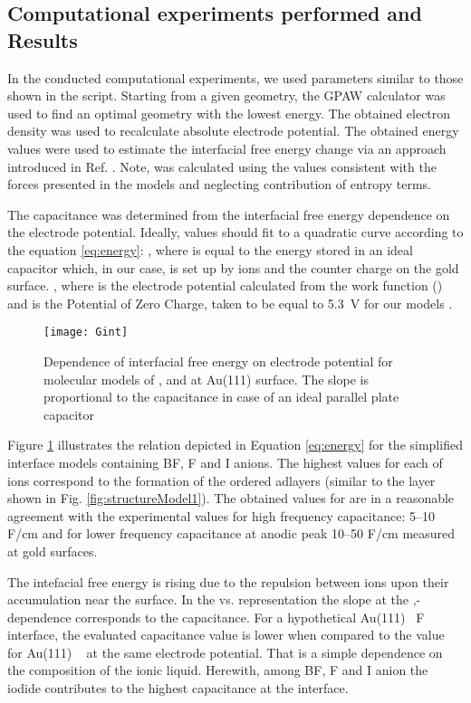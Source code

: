 \documentclass[a4paper,10pt]{article}
\begin{document}
\subsection{Computational experiments performed and Results\label{results}}

In the conducted computational experiments, we used parameters similar to those shown in the script. Starting from a given geometry, the GPAW calculator was used to find an optimal geometry with the lowest energy. The obtained electron density was used to recalculate absolute electrode potential. The obtained energy values were used to estimate the interfacial free energy change via an approach introduced in Ref. \cite{rossmeisl}. Note,  was calculated using the values consistent with the forces presented in the models and neglecting contribution of entropy terms.

The capacitance was determined from the interfacial free energy dependence on the electrode potential. Ideally,  values should fit to a quadratic curve according to the equation \ref{eq:energy}: , where  is equal to the energy stored in an ideal capacitor which, in our case, is set up by ions and the counter charge on the gold surface. , where  is the electrode potential calculated from the work function () and  is the Potential of Zero Charge, taken to be equal to 5.3~V for our models \cite{ivanistsev2012}.

\begin{figure}
\centering
\texttt{[image: Gint]}
\caption{Dependence of  interfacial free energy on electrode potential for molecular models of ,   and  at Au(111) surface. The slope is proportional to the capacitance in case of an ideal parallel plate capacitor}
\label{fig:GU2}
\end{figure}

Figure \ref{fig:GU2} illustrates the relation depicted in Equation \ref{eq:energy} for the simplified interface models containing BF, F and I anions. The highest values for each of ions correspond to the formation of the ordered  adlayers (similar to the  layer shown in Fig. \ref{fig:structureModel1}). The obtained values for  are in a reasonable agreement with the experimental values for high frequency capacitance: 5--10 F/cm \cite{gnahm2010,Gnahm2011,Su2013} and for lower frequency capacitance at anodic peak 10--50 F/cm \cite{gnahm2010,Gnahm2011,Su2013} measured at gold surfaces.

The intefacial free energy is rising due to the repulsion between ions upon their accumulation near the surface. In the  vs.  representation the slope at the ,-dependence corresponds to the capacitance. For a hypothetical Au(111) \textbar~F interface, the evaluated capacitance value is lower when compared to the value for Au(111) \textbar~ at the same electrode potential. That is a simple dependence on the composition of the ionic liquid. Herewith, among BF, F and I anion the iodide contributes to the highest capacitance at the interface.
\end{document}
